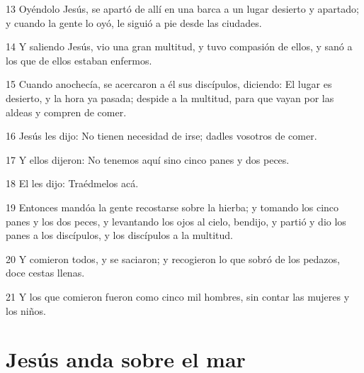 \par 13 Oyéndolo Jesús, se apartó de allí en una barca a un lugar desierto y apartado; y cuando la gente lo oyó, le siguió a pie desde las ciudades.
\par 14 Y saliendo Jesús, vio una gran multitud, y tuvo compasión de ellos, y sanó a los que de ellos estaban enfermos.
\par 15 Cuando anochecía, se acercaron a él sus discípulos, diciendo: El lugar es desierto, y la hora ya pasada; despide a la multitud, para que vayan por las aldeas y compren de comer.
\par 16 Jesús les dijo: No tienen necesidad de irse; dadles vosotros de comer.
\par 17 Y ellos dijeron: No tenemos aquí sino cinco panes y dos peces.
\par 18 El les dijo: Traédmelos acá.
\par 19 Entonces mandóa la gente recostarse sobre la hierba; y tomando los cinco panes y los dos peces, y levantando los ojos al cielo, bendijo, y partió y dio los panes a los discípulos, y los discípulos a la multitud.
\par 20 Y comieron todos, y se saciaron; y recogieron lo que sobró de los pedazos, doce cestas llenas.
\par 21 Y los que comieron fueron como cinco mil hombres, sin contar las mujeres y los niños.

\section*{Jesús anda sobre el mar}


